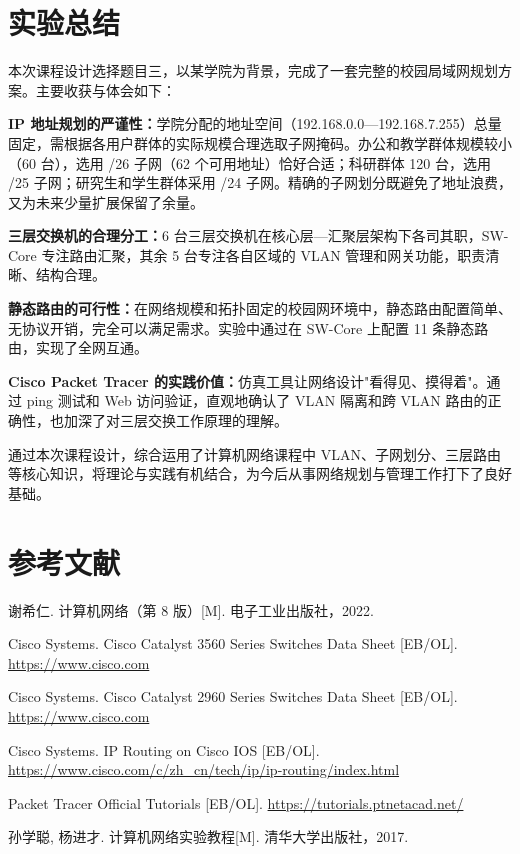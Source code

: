 \documentclass[12pt,a4paper]{ctexart}
\begin{document}
\section{实验总结}

本次课程设计选择题目三，以某学院为背景，完成了一套完整的校园局域网规划方案。主要收获与体会如下：

\textbf{IP 地址规划的严谨性：}学院分配的地址空间（192.168.0.0---192.168.7.255）总量固定，需根据各用户群体的实际规模合理选取子网掩码。办公和教学群体规模较小（60 台），选用 /26 子网（62 个可用地址）恰好合适；科研群体 120 台，选用 /25 子网；研究生和学生群体采用 /24 子网。精确的子网划分既避免了地址浪费，又为未来少量扩展保留了余量。

\textbf{三层交换机的合理分工：}6 台三层交换机在核心层—汇聚层架构下各司其职，SW-Core 专注路由汇聚，其余 5 台专注各自区域的 VLAN 管理和网关功能，职责清晰、结构合理。

\textbf{静态路由的可行性：}在网络规模和拓扑固定的校园网环境中，静态路由配置简单、无协议开销，完全可以满足需求。实验中通过在 SW-Core 上配置 11 条静态路由，实现了全网互通。

\textbf{Cisco Packet Tracer 的实践价值：}仿真工具让网络设计"看得见、摸得着"。通过 ping 测试和 Web 访问验证，直观地确认了 VLAN 隔离和跨 VLAN 路由的正确性，也加深了对三层交换工作原理的理解。

通过本次课程设计，综合运用了计算机网络课程中 VLAN、子网划分、三层路由等核心知识，将理论与实践有机结合，为今后从事网络规划与管理工作打下了良好基础。

\section*{参考文献}

\begin{enumerate}[label={[\arabic*]}]
  \item 谢希仁. 计算机网络（第 8 版）[M]. 电子工业出版社，2022.
  \item Cisco Systems. Cisco Catalyst 3560 Series Switches Data Sheet [EB/OL]. \url{https://www.cisco.com}
  \item Cisco Systems. Cisco Catalyst 2960 Series Switches Data Sheet [EB/OL]. \url{https://www.cisco.com}
  \item Cisco Systems. IP Routing on Cisco IOS [EB/OL]. \url{https://www.cisco.com/c/zh_cn/tech/ip/ip-routing/index.html}
  \item Packet Tracer Official Tutorials [EB/OL]. \url{https://tutorials.ptnetacad.net/}
  \item 孙学聪, 杨进才. 计算机网络实验教程[M]. 清华大学出版社，2017.
\end{enumerate}
\end{document}
